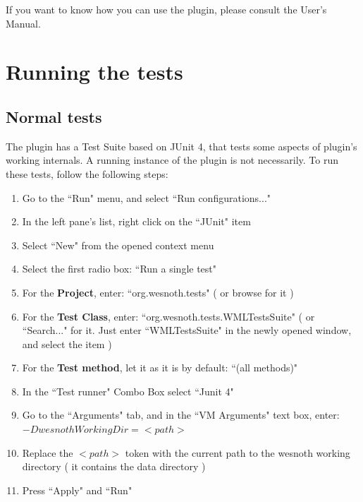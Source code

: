 \documentclass[10pt]{article}
\begin{document}
If you want to know how you can use the plugin, please consult the User's Manual.

\section{Running the tests}
\subsection{Normal tests}
The plugin has a Test Suite based on JUnit 4, that tests some aspects of plugin's working internals. A running instance of the plugin is not necessarily. To run these tests, follow the following steps:
\begin{enumerate}
	\item Go to the ``Run" menu, and select ``Run configurations..."
	\item In the left pane's list, right click on the ``JUnit" item
	\item Select ``New" from the opened context menu
	\item Select the first radio box: ``Run a single test"
	\item For the \textbf{Project}, enter: ``org.wesnoth.tests" ( or browse for it )
	\item For the \textbf{Test Class}, enter: ``org.wesnoth.tests.WMLTestsSuite" ( or ``Search..." for it. Just enter ``WMLTestsSuite" in the newly opened window, and select the item )
	\item For the \textbf{Test method}, let it as it is by default: ``(all methods)"
	\item In the ``Test runner" Combo Box select ``Junit 4"
	\item Go to the ``Arguments" tab, and in the ``VM Arguments" text box, enter: $-DwesnothWorkingDir=<path>$
	\item Replace the $<path>$ token with the current path to the wesnoth working directory ( it contains the data directory )
	\item Press ``Apply" and ``Run"
\end{enumerate}
\end{document}
